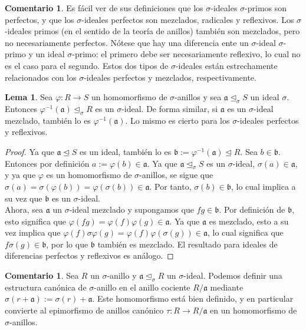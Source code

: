 \documentclass[letterpaper]{article}
\def\a{\mathfrak{a}}
\def\b{\mathfrak{b}}
\def\s{\sigma}
\def\si{\unlhd_{\sigma}}
\theoremstyle{definition}
\newtheorem{rem}[Satz]{Comentario}
\newtheorem{lem}[Satz]{Lema}
\begin{document}
\begin{rem}
Es f\'acil ver de sus definiciones que los $\sigma$-ideales $\sigma$-primos son perfectos, y que los $\sigma$-ideales perfectos son mezclados, radicales y reflexivos. Los $\sigma$-ideales primos (en el sentido de la teor\'ia de anillos) tambi\'en son mezclados, pero no necesariamente perfectos. N\'otese que hay una diferencia ente un $\sigma$-ideal $\sigma$-primo y un ideal $\sigma$-primo: el primero debe ser necesariamente reflexivo, lo cual no es el caso para el segundo. 
Estos dos tipos de $\sigma$-ideales est\'an estrechamente relacionados con los $\sigma$-ideales perfectos y mezclados, respectivamente.
\end{rem}

\begin{lem}\label{bijmapping}
Sea $\varphi: R \rightarrow S$ un homomorfismo de $\sigma$-anillos y sea $\a \si S$ un ideal $\s$. Entonces $\varphi^{-1}(\a) \si R$ es un $\sigma$-ideal. De forma similar, si $\a$ es un $\sigma$-ideal mezclado, tambi\'en lo es $\varphi^{-1}(\a)$. Lo mismo es cierto para los $\sigma$-ideales perfectos y reflexivos. \end{lem}
\begin{proof}
Ya que $\a \unlhd S$ es un ideal, tambi\'en lo es $\b := \varphi^{-1}(\a) \unlhd R$. Sea $b \in \b$. Entonces  por definici\'on $a:=\varphi(b)\in \a$. Ya que $\a \si S$ es un $\sigma$-ideal, $\sigma(a) \in \a$, y ya que $\varphi$ es un homomorfismo de $\sigma$-anillos, se sigue que $\sigma(a) = \sigma(\varphi(b)) = \varphi (\s (b)) \in \a$. Por tanto, $\sigma(b) \in \b$, lo cual implica a su vez que $\b$ es un $\sigma$-ideal.\\

Ahora, sea $\a$ un $\sigma$-ideal mezclado y supongamos que $fg \in \b$. Por definici\'on de $\b$, 
esto significa que $\varphi(fg) = \varphi(f) \varphi(g) \in \a$. Ya que $\a$ es mezclado, esto a su vez implica que $\varphi(f) \s \varphi(g) = \varphi(f) \varphi(\s(g)) \in \a$, lo cual significa que $f\s(g) \in \b$, por lo que $\b$ tambi\'en es mezclado.
El resultado para ideales de diferencias perfectos y reflexivos es an\'alogo.
\end{proof}


\begin{rem}
Sea $R$ un $\sigma$-anillo y $\a \si R$ un $\sigma$-ideal. Podemos definir una estructura can\'onica de $\sigma$-anillo en el anillo cociente $R/\a$ mediante $\s(r+\a):= \s(r) + \a$. 
Este homomorfismo est\'a bien definido, y en particular convierte al epimorfismo de anillos can\'onico $\tau: R \rightarrow R/\a$ en un homomorfismo de $\sigma$-anillos.
\end{rem}
\end{document}
